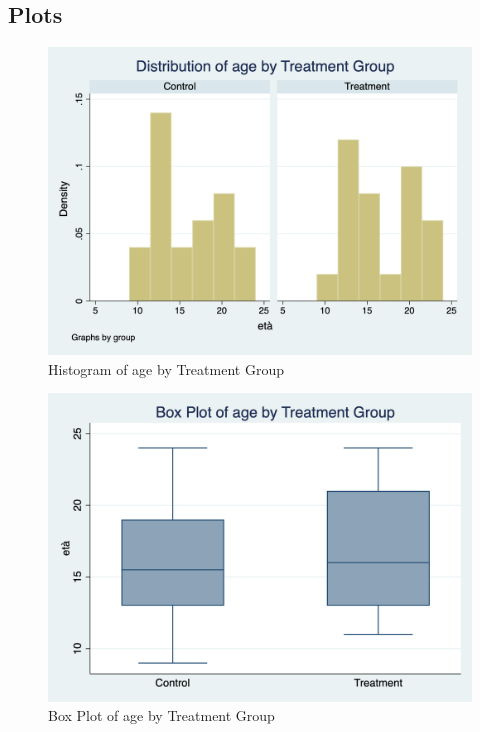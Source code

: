 \documentclass{article}
\begin{document}
\subsection{Plots}
\begin{figure}[!h]
\centering
\includegraphics[scale=0.30]{histogram_eta_trad.png}
\caption{Histogram of age by Treatment Group}
\end{figure}

\begin{figure}[!h]
\centering
\includegraphics[scale=0.30]{box_plot_eta_trad.png}
\caption{Box Plot of age by Treatment Group}
\end{figure}
\end{document}
